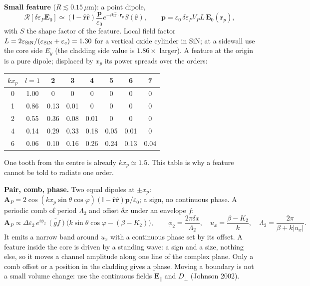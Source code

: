 \documentclass[11pt,a4paper]{article}
\begin{document}
\textbf{Small feature} ($R\lesssim0.15$\,$\mu$m): a point dipole,
\[
\mathcal R[\delta\varepsilon_P\mathbf E_0]\simeq(\mathsf I-\hat{\mathbf r}\hat{\mathbf r})\frac{\mathbf p}{\varepsilon_0}
e^{-ik\hat{\mathbf r}\cdot\mathbf r_p}S(\hat{\mathbf r}),\qquad
\mathbf p=\varepsilon_0\,\delta\varepsilon_PV_PL\,\mathbf E_0(\mathbf r_p),
\]
with $S$ the shape factor of the feature. Local field factor $L=2\varepsilon_{\rm SiN}/(\varepsilon_{\rm SiN}+\varepsilon_c)=1.30$ for a vertical oxide
cylinder in SiN; at a sidewall use the core side $E_y$ (the cladding side value is $1.86\times$ larger). A
feature at the origin is a pure dipole; displaced by $x_p$ its power spreads over the orders:
\begin{center}\small\begin{tabular}{cccccccc}\hline
$kx_p$ & $l=1$ & 2 & 3 & 4 & 5 & 6 & 7\\\hline
0 & 1.00 & 0 & 0 & 0 & 0 & 0 & 0\\
1 & 0.86 & 0.13 & 0.01 & 0 & 0 & 0 & 0\\
2 & 0.55 & 0.36 & 0.08 & 0.01 & 0 & 0 & 0\\
4 & 0.14 & 0.29 & 0.33 & 0.18 & 0.05 & 0.01 & 0\\
6 & 0.06 & 0.10 & 0.16 & 0.26 & 0.24 & 0.13 & 0.04\\\hline
\end{tabular}\end{center}
One tooth from the centre is already $kx_p\simeq1.5$. This table is why a feature cannot be told to radiate one
order.

\textbf{Pair, comb, phase.} Two equal dipoles at $\pm x_p$:
$\mathbf A_P=2\cos(kx_p\sin\theta\cos\varphi)(\mathsf I-\hat{\mathbf r}\hat{\mathbf r})\mathbf p/\varepsilon_0$; a
sign, no continuous phase. A periodic comb of period $\Lambda_2$ and offset $\delta x$ under an envelope $f$:
\[
\mathbf A_P\propto\Delta\varepsilon_2\,e^{i\phi_2}\,\widetilde{(gf)}\bigl(k\sin\theta\cos\varphi-(\beta-K_2)\bigr),\qquad
\phi_2=\frac{2\pi\delta x}{\Lambda_2},\quad u_x=\frac{\beta-K_2}{k},\quad\Lambda_2=\frac{2\pi}{\beta+k|u_x|}.
\]
It emits a narrow band around $u_x$ with a continuous phase set by its offset. A feature inside the core is
driven by a standing wave: a sign and a size, nothing else, so it moves a channel amplitude along one line of
the complex plane. Only a comb offset or a position in the cladding gives a phase. Moving a boundary is not a
small volume change: use the continuous fields $\mathbf E_\parallel$ and $D_\perp$ (Johnson 2002).
\end{document}
